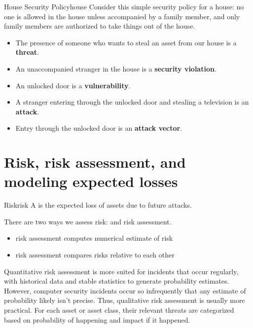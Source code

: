 \begin{exbox}{House Security Policy}{house}
    Consider this simple security policy for a house: no one is allowed in the house unless accompanied by a family member, and only family members are authorized to take things out of the house.
    \begin{itemize}[noitemsep]
        \item The presence of someone who wants to steal an asset from our house is a \textbf{threat}.
        \item An unaccompanied stranger in the house is a \textbf{security violation}.
        \item An unlocked door is a \textbf{vulnerability}.
        \item A stranger entering through the unlocked door and stealing a television is an \textbf{attack}.
        \item Entry through the unlocked door is an \textbf{attack vector}.
    \end{itemize}
\end{exbox}

\section{Risk, risk assessment, and modeling expected losses}

\begin{dfnbox}{Risk}{risk}
    A  is the expected loss of assets due to future attacks.
\end{dfnbox}

There are two ways we assess risk:  and  risk assessment.
\begin{itemize}
    \item {} risk assessment computes numerical estimate of risk
    \item {} risk assessment compares risks relative to each other
\end{itemize}

Quantitative risk assessment is more suited for incidents that occur regularly, with historical data and stable statistics to generate probability estimates. However, computer security incidents occur so infrequently that any estimate of probability likely isn't precise. Thus, qualitative risk assessment is usually more practical. For each asset or asset class, their relevant threats are categorized based on probability of happening and impact if it happened.

